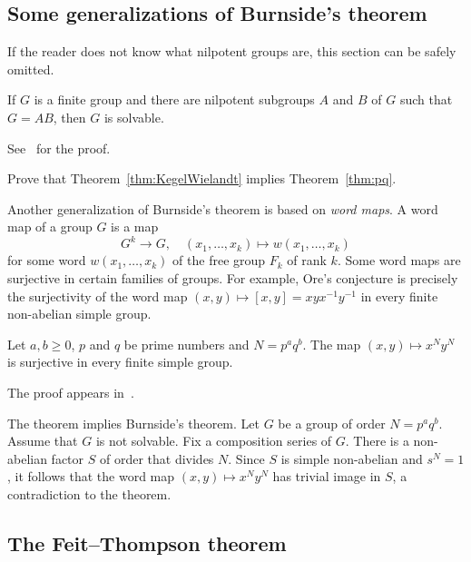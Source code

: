\subsection{Some generalizations of Burnside's theorem}

If the reader does not know what nilpotent groups are, this section can be safely omitted.

\begin{theorem}
    \label{thm:KegelWielandt}
    If $G$ is a finite group and there are nilpotent subgroups 
    $A$ and $B$ of $G$ such that 
    $G=AB$, then $G$ is solvable.
\end{theorem}

See~\cite[Theorem 2.4.3]{MR1211633} for the proof.

\begin{exercise}
    Prove that Theorem~\ref{thm:KegelWielandt} 
    implies Theorem~\ref{thm:pq}.
\end{exercise}

Another generalization of Burnside's theorem
is based on \emph{word maps}. A word map
of a group $G$ is a map 
\[
G^k\to G,\quad 
(x_1,\dots,x_k)\mapsto w(x_1,\dots,x_k)
\]
for some word $w(x_1,\dots,x_k)$ of the free group $F_k$ of rank $k$. 
Some word maps are surjective in certain families of groups. For example, 
Ore's conjecture is precisely the surjectivity of the word map
$(x,y)\mapsto [x,y]=xyx^{-1}y^{-1}$ in every finite non-abelian simple 
group. 

\begin{theorem}
    Let $a,b\geq0$, $p$ and $q$ be prime numbers and $N=p^aq^b$. The map 
    $(x,y)\mapsto x^Ny^N$ is surjective in every finite simple group. 
\end{theorem}

The proof appears in~\cite{MR3827208}. 

The theorem implies Burnside's theorem. Let $G$ be a group of order
$N=p^aq^b$. Assume that $G$ is not solvable. 
Fix a composition series of $G$. There is a non-abelian factor $S$ 
of order that divides $N$. Since 
$S$ is simple non-abelian and $s^N=1$, it follows that the word map
$(x,y)\mapsto x^Ny^N$ has trivial image in $S$, a contradiction 
to the theorem. 

\subsection{The Feit--Thompson theorem}

